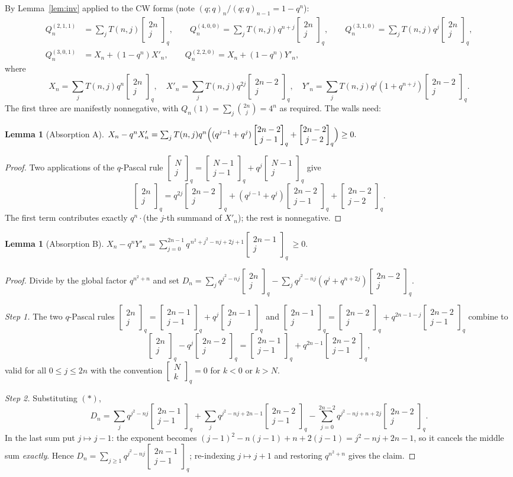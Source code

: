 \documentclass[11pt]{article}
\newtheorem{lemma}[theorem]{Lemma}
\newcommand{\qbin}[2]{\begin{bmatrix}#1\\#2\end{bmatrix}_q}
\newcommand{\poch}[1]{(q;q)_{#1}}
\begin{document}
By Lemma~\ref{lem:inv} applied to the CW forms (note
$\poch{n}/\poch{n-1}=1-q^n$):
\begin{align*}
Q_n^{(2,1,1)}&=\sum_{j}T(n,j)\qbin{2n}{j},\qquad
Q_n^{(4,0,0)}=\sum_{j}T(n,j)q^{n+j}\qbin{2n}{j},\qquad
Q_n^{(3,1,0)}=\sum_{j}T(n,j)q^{j}\qbin{2n}{j},\\
Q_n^{(3,0,1)}&=X_n+(1-q^n)X'_n,\qquad
Q_n^{(2,2,0)}=X_n+(1-q^n)Y'_n,
\end{align*}
where
\[
X_n=\sum_jT(n,j)q^n\qbin{2n}{j},\quad
X'_n=\sum_jT(n,j)q^{2j}\qbin{2n-2}{j},\quad
Y'_n=\sum_jT(n,j)q^{j}(1+q^{n+j})\qbin{2n-2}{j}.
\]
The first three are manifestly nonnegative, with $Q_n(1)=\sum_j\binom{2n}{j}=4^n$ as
required. The walls need:

\begin{lemma}[Absorption A]\label{lem:A}
$X_n-q^nX'_n=\sum_jT(n,j)q^n\Bigl((q^{j-1}+q^{j})\qbin{2n-2}{j-1}+\qbin{2n-2}{j-2}\Bigr)\ge0.$
\end{lemma}

\begin{proof}
Two applications of the $q$-Pascal rule $\qbin{N}{j}=\qbin{N-1}{j-1}+q^j\qbin{N-1}{j}$ give
\[
\qbin{2n}{j}=q^{2j}\qbin{2n-2}{j}+(q^{j-1}+q^{j})\qbin{2n-2}{j-1}+\qbin{2n-2}{j-2}.
\]
The first term contributes exactly $q^n\cdot$(the $j$-th summand of $X'_n$); the rest is
nonnegative.
\end{proof}

\begin{lemma}[Absorption B]\label{lem:B}
$\displaystyle X_n-q^nY'_n=\sum_{j=0}^{2n-1}q^{\,n^2+j^2-nj+2j+1}\qbin{2n-1}{j}\ \ge0.$
\end{lemma}

\begin{proof}
Divide by the global factor $q^{n^2+n}$ and set
$D_n=\sum_jq^{j^2-nj}\qbin{2n}{j}-\sum_jq^{j^2-nj}(q^{j}+q^{n+2j})\qbin{2n-2}{j}$.

\emph{Step 1.} The two $q$-Pascal rules
$\qbin{2n}{j}=\qbin{2n-1}{j-1}+q^j\qbin{2n-1}{j}$ and
$\qbin{2n-1}{j}=\qbin{2n-2}{j}+q^{2n-1-j}\qbin{2n-2}{j-1}$ combine to
\[
\qbin{2n}{j}-q^{j}\qbin{2n-2}{j}=\qbin{2n-1}{j-1}+q^{2n-1}\qbin{2n-2}{j-1},
\tag{$*$}
\]
valid for all $0\le j\le2n$ with the convention $\qbin{N}{k}=0$ for $k<0$ or $k>N$.

\emph{Step 2.} Substituting $(*)$,
\[
D_n=\sum_jq^{j^2-nj}\qbin{2n-1}{j-1}
+\sum_jq^{j^2-nj+2n-1}\qbin{2n-2}{j-1}
-\sum_{j=0}^{2n-2}q^{j^2-nj+n+2j}\qbin{2n-2}{j}.
\]
In the last sum put $j\mapsto j-1$: the exponent becomes
$(j-1)^2-n(j-1)+n+2(j-1)=j^2-nj+2n-1$, so it cancels the middle sum \emph{exactly}.
Hence $D_n=\sum_{j\ge1}q^{j^2-nj}\qbin{2n-1}{j-1}$; re-indexing $j\mapsto j+1$ and
restoring $q^{n^2+n}$ gives the claim.
\end{proof}
\end{document}
